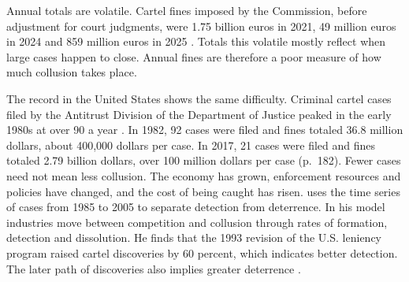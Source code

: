 Annual totals are volatile. Cartel fines imposed by the Commission, before adjustment for court judgments, were
1.75 billion euros in 2021, 49 million euros in 2024 and 859 million euros in 2025 \citep[Table~1]{EuropeanCommission2026}.
Totals this volatile mostly reflect when large cases happen to close. Annual fines are therefore a poor measure of
how much collusion takes place.

The record in the United States shows the same difficulty. Criminal cartel cases filed by the Antitrust Division of
the Department of Justice peaked in the early 1980s at over 90 a year \citep[p.~182]{AskerNocke2021}. In 1982, 92
cases were filed and fines totaled 36.8 million dollars, about 400,000 dollars per case. In 2017, 21 cases were
filed and fines totaled 2.79 billion dollars, over 100 million dollars per case (p.~182). Fewer cases need not mean
less collusion. The economy has grown, enforcement resources and policies have changed, and the cost of being caught
has risen. \citet{Miller2009} uses the time series of cases from 1985 to 2005 to separate detection from deterrence.
In his model industries move between competition and collusion through rates of formation, detection and
dissolution. He finds that the 1993 revision of the U.S. leniency program raised cartel discoveries by 60 percent,
which indicates better detection. The later path of discoveries also implies greater deterrence
\citep[pp.~186--187]{AskerNocke2021}.

